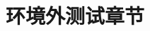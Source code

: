 \documentclass[color=green]{textbook-cn}%
\begin{document}
\chapter{环境外测试章节}

\begin{Exercise}
	\lipsum[2]
\end{Exercise}

\begin{Thinking}
	\lipsum[2]
\end{Thinking}


\begin{Improve}
	\lipsum[2]
\end{Improve}



\begin{Definition}[定义名称]
	\lipsum[2]
\end{Definition}
\end{document}
